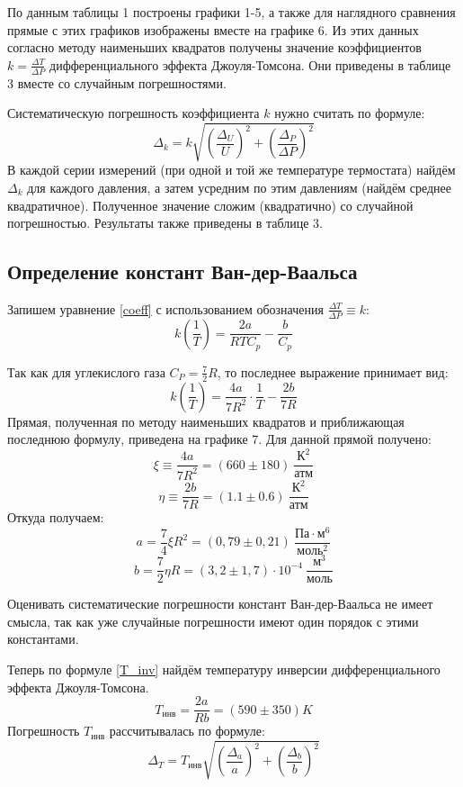 \documentclass[15pt,a5paper,reqno]{article}
\begin{document}
    По данным таблицы 1 построены графики 1-5, а также для наглядного сравнения прямые с этих графиков изображены вместе на графике 6. Из этих данных согласно методу наименьших квадратов получены значение коэффициентов $k = \frac{\Delta T}{\Delta P}$ дифференциального эффекта Джоуля-Томсона. Они приведены в таблице 3 вместе со случайным погрешностями.
    
    Систематическую погрешность коэффициента $k$ нужно считать по формуле:
    \[\Delta_k = k\sqrt{\left(\frac{\Delta_U}{U}\right)^2 + \left(\frac{\Delta_P}{\Delta P}\right)^2}\]
    В каждой серии измерений (при одной и той же температуре термостата) найдём $\Delta_k$ для каждого давления, а затем усредним по этим давлениям (найдём среднее квадратичное). Полученное значение сложим (квадратично) со случайной погрешностью. Результаты также приведены в таблице 3.
    
    \subsection{Определение констант Ван-дер-Ваальса}
    
    Запишем уравнение \eqref{coeff} с использованием обозначения $\frac{\Delta T}{\Delta P} \equiv k$:
    \[k\left(\frac{1}{T}\right) = \frac{2a}{RTC_p} - \frac{b}{C_p}\]
    
    Так как для углекислого газа $C_P = \frac{7}{2}R$, то последнее выражение принимает вид:
    \[k\left(\frac{1}{T}\right) = \frac{4a}{7R^2}\cdot\frac{1}{T} - \frac{2b}{7R}\]
    Прямая, полученная по методу наименьших квадратов и приближающая последнюю формулу, приведена на графике 7. Для данной прямой получено:
    \[\xi \equiv \frac{4a}{7R^2} = (660 \pm 180)\ \frac{\text{К}^2}{\text{атм}}\]
    \[\eta \equiv \frac{2b}{7R} = (1.1 \pm 0.6)\ \frac{\text{К}^2}{\text{атм}}\]
    Откуда получаем:
    \[a = \frac{7}{4}\xi R^2 = (0,79 \pm 0,21)\ \frac{\text{Па}\cdot\text{м}^6}{\text{моль}^2}\]
    \[b = \frac{7}{2}\eta R = (3,2 \pm 1,7)\cdot10^{-4}\ \frac{\text{м}^3}{\text{моль}}\]
    
    Оценивать систематические погрешности констант Ван-дер-Ваальса не имеет смысла, так как уже случайные погрешности имеют один порядок с этими константами.
    
    Теперь по формуле \eqref{T_inv} найдём температуру инверсии дифференциального эффекта Джоуля-Томсона.
    \[T_{\text{инв}} = \frac{2a}{Rb} = (590 \pm 350)K\]
    Погрешность $T_{\text{инв}}$ рассчитывалась по формуле:
    \[\Delta_T = T_{\text{инв}}\sqrt{\left(\frac{\Delta_a}{a}\right)^2 + \left(\frac{\Delta_b}{b}\right)^2}\]
    
\end{document}
